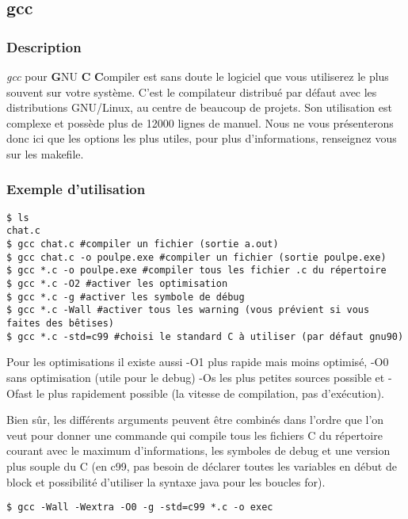 \subsection*{gcc}
\subsubsection*{Description}
\emph{gcc} pour \textbf{G}NU \textbf{C} \textbf{C}ompiler est sans doute le
logiciel que vous utiliserez le plus souvent sur votre système.  C'est le
compilateur distribué par défaut avec les distributions GNU/Linux, au centre de
beaucoup de projets. Son utilisation est complexe et possède plus de 12000
lignes de manuel.  Nous ne vous présenterons donc ici que les options les plus
utiles, pour plus d'informations, renseignez vous sur les makefile.

\subsubsection*{Exemple d'utilisation}

\begin{lstlisting}
$ ls
chat.c
$ gcc chat.c #compiler un fichier (sortie a.out)
$ gcc chat.c -o poulpe.exe #compiler un fichier (sortie poulpe.exe)
$ gcc *.c -o poulpe.exe #compiler tous les fichier .c du répertoire
$ gcc *.c -O2 #activer les optimisation 
$ gcc *.c -g #activer les symbole de débug
$ gcc *.c -Wall #activer tous les warning (vous prévient si vous faites des bêtises)
$ gcc *.c -std=c99 #choisi le standard C à utiliser (par défaut gnu90)
\end{lstlisting}

Pour les optimisations il existe aussi -O1 plus rapide mais moins optimisé, -O0
sans optimisation (utile pour le debug) -Os les plus petites sources possible
et -Ofast le plus rapidement possible (la vitesse de compilation, pas
d'exécution).

Bien sûr, les différents arguments peuvent être combinés dans l'ordre que l'on
veut pour donner une commande qui compile tous les fichiers C du répertoire
courant avec le maximum d'informations, les symboles de debug et une version
plus souple du C (en c99, pas besoin de déclarer toutes les variables en début
de block et possibilité d'utiliser la syntaxe java pour les boucles for).
\begin{lstlisting}
$ gcc -Wall -Wextra -O0 -g -std=c99 *.c -o exec
\end{lstlisting}
